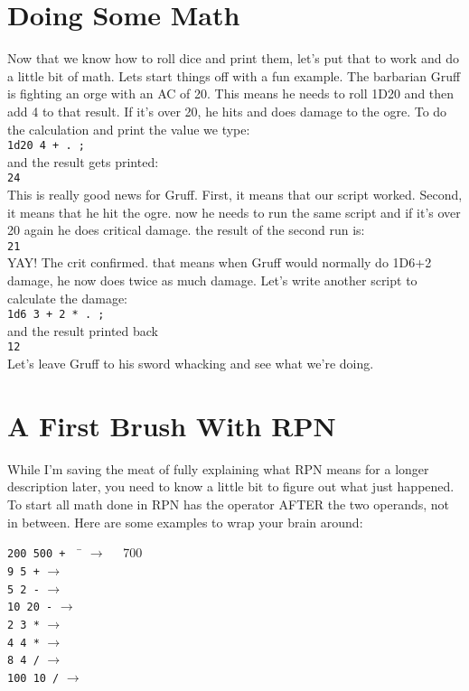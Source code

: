\section{Doing Some Math}
\label{basicMath}
Now that we know how to roll dice and print them, let's put that to work and
do a little bit of math. Lets start things off with a fun example. The barbarian
Gruff is fighting an orge with an AC of 20. This means he needs to roll
1D20 and then add 4 to that result. If it's over 20, he hits and does damage to
the ogre. To do the calculation and print the value we type:\\
\indent\texttt{1d20 4 + . ;}\\
and the result gets printed:\\
\indent\texttt{24}\\
This is really good news for Gruff. First, it means that our script worked.
Second, it means that he hit the ogre. now he needs to run the same script and
if it's over 20 again he does critical damage. the result of the second run
is:\\
\indent\texttt{21}\\
YAY! The crit confirmed. that means when Gruff would normally do 1D6+2 damage,
he now does twice as much damage. Let's write another script to calculate the
damage:\\
\indent\texttt{1d6 3 + 2 * . ;}\\
and the result printed back\\
\indent\texttt{12}\\
Let's leave Gruff to his sword whacking and see what we're doing.

\section{A First Brush With RPN}
\label{firstRPN}
While I'm saving the meat of fully explaining what RPN means for a longer
description later, you need to know a little bit to figure out what just
happened. To start all math done in RPN has the operator AFTER the two
operands, not in between. Here are some examples to wrap your brain around:
\begin{tabbing}
\texttt{200 500 +} \ \ \= $\longrightarrow$ \ \ \= 700\\
\texttt{9 5 +} \> $\longrightarrow$ \\
\texttt{5 2 -} \> $\longrightarrow$ \\
\texttt{10 20 -} \> $\longrightarrow$ \\
\texttt{2 3 *} \> $\longrightarrow$ \\
\texttt{4 4 *} \> $\longrightarrow$ \\
\texttt{8 4 /} \> $\longrightarrow$ \\
\texttt{100 10 /} \> $\longrightarrow$ 
\end{tabbing}

